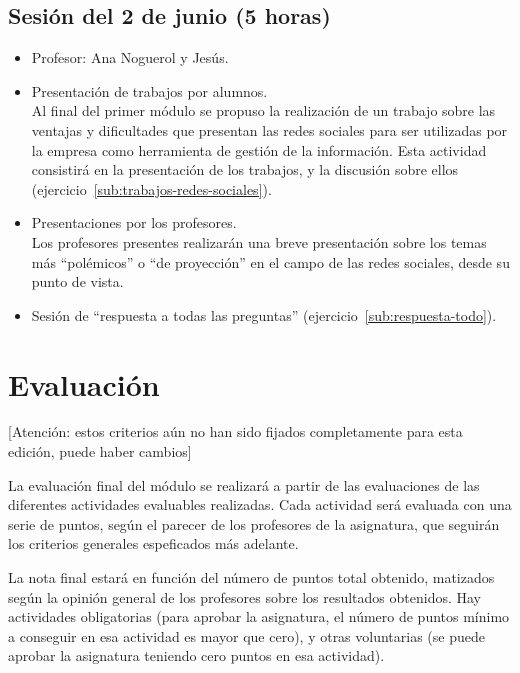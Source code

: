 \documentclass[a4paper,12pt]{article}
\begin{document}
\subsection{Sesión del 2 de junio (5 horas)}

\begin{itemize}
\item Profesor: Ana Noguerol y Jesús.
\item Presentación de trabajos por alumnos. \\
  Al final del primer módulo se propuso la realización de un trabajo sobre las ventajas y dificultades que presentan las redes sociales para ser utilizadas por la empresa como herramienta de gestión de la información. Esta actividad consistirá en la presentación de los trabajos, y la discusión sobre ellos (ejercicio~\ref{sub:trabajos-redes-sociales}).
\item Presentaciones por los profesores. \\
  Los profesores presentes realizarán una breve presentación sobre los temas más ``polémicos'' o ``de proyección'' en el campo de las redes sociales, desde su punto de vista.
\item Sesión de ``respuesta a todas las preguntas'' (ejercicio~\ref{sub:respuesta-todo}).
\end{itemize}

\section{Evaluación}

[Atención: estos criterios aún no han sido fijados completamente para esta edición, puede haber cambios]

La evaluación final del módulo se realizará a partir de las evaluaciones de las diferentes actividades evaluables realizadas. Cada actividad será evaluada con una serie de puntos, según el parecer de los profesores de la asignatura, que seguirán los criterios generales espeficados más adelante.

La nota final estará en función del número de puntos total obtenido, matizados según la opinión general de los profesores sobre los resultados obtenidos. Hay actividades obligatorias (para aprobar la asignatura, el número de puntos mínimo a conseguir en esa actividad es mayor que cero), y otras voluntarias (se puede aprobar la asignatura teniendo cero puntos en esa actividad).
\end{document}
